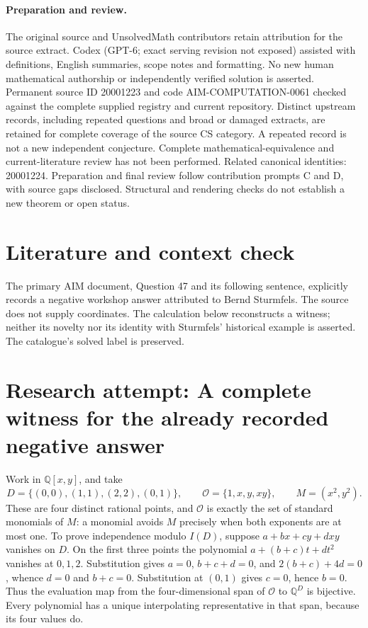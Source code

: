 \documentclass[11pt]{article}
\begin{document}
\paragraph{Preparation and review.}
The original source and UnsolvedMath contributors retain attribution for the source extract. Codex (GPT-6; exact serving revision not exposed) assisted with definitions, English summaries, scope notes and formatting. No new human mathematical authorship or independently verified solution is asserted. Permanent source ID 20001223 and code AIM-COMPUTATION-0061 checked against the complete supplied registry and current repository. Distinct upstream records, including repeated questions and broad or damaged extracts, are retained for complete coverage of the source CS category. A repeated record is not a new independent conjecture. Complete mathematical-equivalence and current-literature review has not been performed. Related canonical identities: 20001224. Preparation and final review follow contribution prompts C and D, with source gaps disclosed. Structural and rendering checks do not establish a new theorem or open status.
\label{end:20001223}

\section{Literature and context check}
The primary AIM document, Question 47 and its following sentence, explicitly records a negative workshop answer attributed to Bernd Sturmfels. The source does not supply coordinates. The calculation below reconstructs a witness; neither its novelty nor its identity with Sturmfels' historical example is asserted. The catalogue's solved label is preserved.
\section{Research attempt: A complete witness for the already recorded negative answer}
Work in $\mathbb Q[x,y]$, and take
\[
D=\{(0,0),(1,1),(2,2),(0,1)\},\qquad
\mathcal O=\{1,x,y,xy\},\qquad M=(x^2,y^2).
\]
These are four distinct rational points, and $\mathcal O$ is exactly the set of standard monomials of $M$: a monomial avoids $M$ precisely when both exponents are at most one. To prove independence modulo $I(D)$, suppose $a+bx+cy+dxy$ vanishes on $D$. On the first three points the polynomial $a+(b+c)t+dt^2$ vanishes at $0,1,2$. Substitution gives $a=0$, $b+c+d=0$, and $2(b+c)+4d=0$, whence $d=0$ and $b+c=0$. Substitution at $(0,1)$ gives $c=0$, hence $b=0$. Thus the evaluation map from the four-dimensional span of $\mathcal O$ to $\mathbb Q^D$ is bijective. Every polynomial has a unique interpolating representative in that span, because its four values do.
\end{document}
